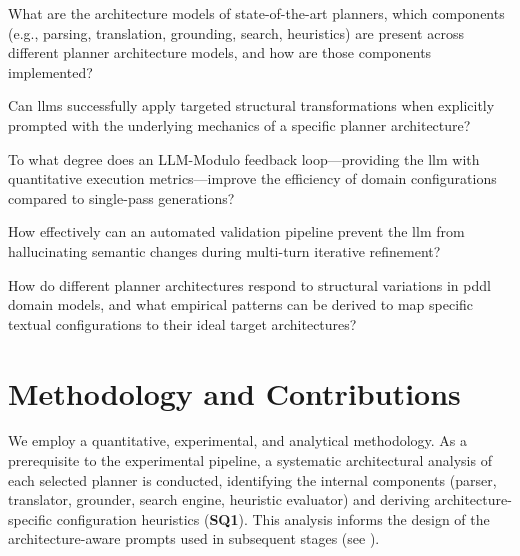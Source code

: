\begin{description}[style=nextline, leftmargin=1.5cm, labelwidth=1cm]
  \item[\textbf{SQ1:}]
        What are the architecture models of state-of-the-art planners, which components (e.g., parsing, translation, grounding, search, heuristics) are present across different planner architecture models, and how are those components implemented?

  \item[\textbf{SQ2:}]
        Can \glspl{llm} successfully apply targeted structural transformations when explicitly prompted with the underlying mechanics of a specific planner architecture?

  \item[\textbf{SQ3:}]
        To what degree does an LLM-Modulo feedback loop---providing the \gls{llm} with quantitative execution metrics---improve the efficiency of domain configurations compared to single-pass generations?

  \item[\textbf{SQ4:}]
        How effectively can an automated validation pipeline prevent the \gls{llm} from hallucinating semantic changes during multi-turn iterative refinement?

  \item[\textbf{SQ5:}]
        How do different planner architectures respond to structural variations in \gls{pddl} domain models, and what empirical patterns can be derived to map specific textual configurations to their ideal target architectures?
\end{description}

\section{Methodology and Contributions}
\label{sec:intro:methodology}

We employ a quantitative, experimental, and analytical methodology.
As a prerequisite to the experimental pipeline, a systematic architectural analysis of each selected planner is conducted, identifying the internal components (parser, translator, grounder, search engine, heuristic evaluator) and deriving architecture-specific configuration heuristics (\textbf{SQ1}).
This analysis informs the design of the architecture-aware prompts used in subsequent stages (see ).

